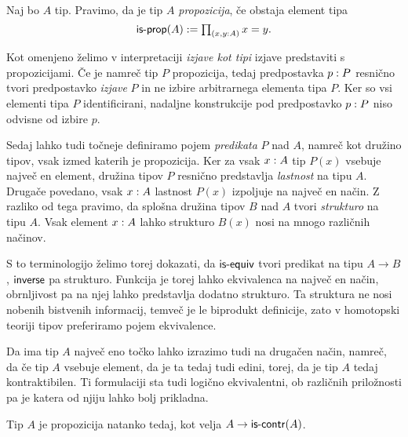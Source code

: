 \begin{definicija}
  Naj bo \(A\) tip. Pravimo, da je tip \(A\) \emph{propozicija}, če obstaja element tipa
  \[\textnormal{\textsf{is-prop}}(A) := \textstyle \prod_{\left( x, y : A \right)} x = y.\]
\end{definicija}
\begin{opomba}
Kot omenjeno želimo v interpretaciji \emph{izjave kot tipi} izjave predstaviti s propozicijami. Če je namreč tip \(P\) propozicija, tedaj predpostavka \(p : P\) resnično tvori predpostavko \emph{izjave} \(P\) in ne izbire arbitrarnega elementa tipa \(P\). Ker so vsi elementi tipa \(P\) identificirani, nadaljne konstrukcije pod predpostavko \(p : P\) niso odvisne od izbire \(p\).

Sedaj lahko tudi točneje definiramo pojem \emph{predikata} \(P\) nad \(A\), namreč kot družino tipov, vsak izmed katerih je propozicija. Ker za vsak \(x : A\) tip \(P(x)\) vsebuje največ en element, družina tipov \(P\) resnično predstavlja \emph{lastnost} na tipu \(A\). Drugače povedano, vsak \(x : A\) lastnost \(P(x)\) izpoljuje na največ en način. Z razliko od tega pravimo, da splošna družina tipov \(B\) nad \(A\) tvori \emph{strukturo} na tipu \(A\). Vsak element \(x : A\) lahko strukturo \(B(x)\) nosi na mnogo različnih načinov.

S to terminologijo želimo torej dokazati, da \(\textnormal{\textsf{is-equiv}}\) tvori predikat na tipu \(A \to B\), \(\textnormal{\textsf{inverse}}\) pa strukturo. Funkcija je torej lahko ekvivalenca na največ en način, obrnljivost pa na njej lahko predstavlja dodatno strukturo. Ta struktura ne nosi nobenih bistvenih informacij, temveč je le biprodukt definicije, zato v homotopski teoriji tipov preferiramo pojem ekvivalence.
\end{opomba}

Da ima tip \(A\) največ eno točko lahko izrazimo tudi na drugačen način, namreč, da če tip \(A\) vsebuje element, da je ta tedaj tudi edini, torej, da je tip \(A\) tedaj kontraktibilen. Ti formulaciji sta tudi logično ekvivalentni, ob različnih priložnosti pa je katera od njiju lahko bolj prikladna.

\begin{trditev}
  Tip \(A\) je propozicija natanko tedaj, kot velja \(A \to \textnormal{\textsf{is-contr}}(A)\).
\end{trditev}

